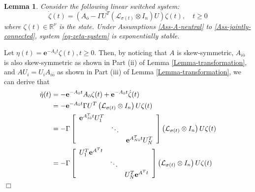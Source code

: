 \documentclass[twocolumn]{autart}
\newcommand{\RR}{\mathbb{R}}
\newtheorem{Lemma}{Lemma}
\newenvironment{Proof}{\noindent{\em Proof:\/}}{\hfill $\Box$\par}
\begin{document}
\begin{Lemma}\label{Lemma-zeta-stable}
 Consider the following linear switched system:
  \begin{equation}\label{eq-zeta-system}
    \dot{\zeta}(t)=\left(A_{\bar{\text{o}}}-\Gamma U^{T}\left(\mathcal{L}_{\sigma(t)} \otimes I_{n}\right)U \right)\zeta(t),
    \quad t\ge 0
  \end{equation}
  where $\zeta(t) \in \RR^{\nu}$ is the state.
  Under Assumptions \ref{Ass-A-neutral} to \ref{Ass-jointly-connected},
  system \eqref{eq-zeta-system} is exponentially stable.
\end{Lemma}


\begin{Proof}
  Let $\eta(t)=\mathbf{e}^{-A_{\bar{\text{o}}}t}\zeta(t), t\ge 0$.
  Then, by noticing that $A$ is skew-symmetric, $A_{i\bar{\text{o}}}$ is also skew-symmetric as shown in Part (ii) of Lemma \ref{Lemma-transformation},
  and $AU_{i}=U_{i}A_{i\bar{\text{o}}}$ as shown in Part (iii) of Lemma \ref{Lemma-transformation},
  we can derive that
  \begin{align*}
    \dot{\eta}(t)&=-\mathbf{e}^{-A_{\bar{\text{o}}}t} A_{\bar{\text{o}}} \zeta(t)+\mathbf{e}^{-A_{\bar{\text{o}}}t} \dot{\zeta}(t) \notag \\
     &=-\mathbf{e}^{-A_{\bar{\text{o}}}t} \Gamma U^{T}\left(\mathcal{L}_{\sigma(t)} \otimes I_{n}\right)U \zeta(t) \notag \\
     &=- \Gamma\left[
                 \begin{array}{ccc}
                  \mathbf{e}^{A^{T}_{1\bar{\text{o}}}t}U_{1}^{T} &  &  \\
                    & \ddots &  \\
                    &  & \mathbf{e}^{A^{T}_{N\bar{\text{o}}}t}U_{N}^{T} \\
                 \end{array}
               \right]\left(\mathcal{L}_{\sigma(t)} \otimes I_{n}\right)U \zeta(t) \notag \\
     &=- \Gamma \left[
                 \begin{array}{ccc}
                   U_{1}^{T}\mathbf{e}^{A^{T}t} &  &  \\
                    & \ddots &  \\
                    &  & U_{N}^{T}\mathbf{e}^{A^{T}t}  \\
                 \end{array}
               \right]\left(\mathcal{L}_{\sigma(t)} \otimes I_{n}\right)U \zeta(t) \notag \\

\end{align*}
\end{Proof}
\end{document}
